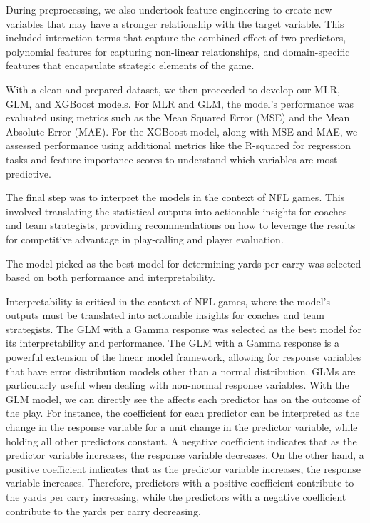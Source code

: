 \documentclass[
  super,
  preprint,
  3p]{elsarticle}
\begin{document}
During preprocessing, we also undertook feature engineering to create
new variables that may have a stronger relationship with the target
variable. This included interaction terms that capture the combined
effect of two predictors, polynomial features for capturing non-linear
relationships, and domain-specific features that encapsulate strategic
elements of the game.

With a clean and prepared dataset, we then proceeded to develop our MLR,
GLM, and XGBoost models. For MLR and GLM, the model's performance was
evaluated using metrics such as the Mean Squared Error (MSE) and the
Mean Absolute Error (MAE). For the XGBoost model, along with MSE and
MAE, we assessed performance using additional metrics like the R-squared
for regression tasks and feature importance scores to understand which
variables are most predictive.

The final step was to interpret the models in the context of NFL games.
This involved translating the statistical outputs into actionable
insights for coaches and team strategists, providing recommendations on
how to leverage the results for competitive advantage in play-calling
and player evaluation.

The model picked as the best model for determining yards per carry was
selected based on both performance and interpretability.

Interpretability is critical in the context of NFL games, where the
model's outputs must be translated into actionable insights for coaches
and team strategists. The GLM with a Gamma response was selected as the
best model for its interpretability and performance. The GLM with a
Gamma response is a powerful extension of the linear model framework,
allowing for response variables that have error distribution models
other than a normal distribution. GLMs are particularly useful when
dealing with non-normal response variables. With the GLM model, we can
directly see the affects each predictor has on the outcome of the play.
For instance, the coefficient for each predictor can be interpreted as
the change in the response variable for a unit change in the predictor
variable, while holding all other predictors constant. A negative
coefficient indicates that as the predictor variable increases, the
response variable decreases. On the other hand, a positive coefficient
indicates that as the predictor variable increases, the response
variable increases. Therefore, predictors with a positive coefficient
contribute to the yards per carry increasing, while the predictors with
a negative coefficient contribute to the yards per carry decreasing.
\end{document}
